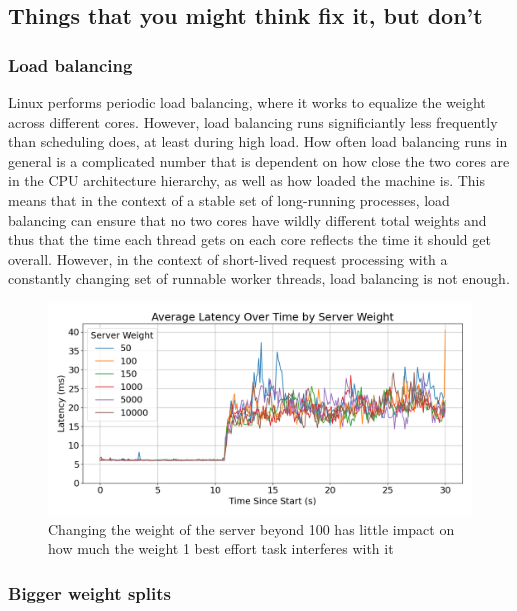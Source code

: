 \subsection{Things that you might think fix it, but don't}

\subsubsection{Load balancing}

Linux performs periodic load balancing, where it works to equalize the weight
across different cores. However, load balancing runs significiantly less
frequently than scheduling does, at least during high load. How often load
balancing runs in general is a complicated number that is dependent on how close
the two cores are in the CPU architecture hierarchy, as well as how loaded the
machine is. This means that in the context of a stable set of long-running
processes, load balancing can ensure that no two cores have wildly different
total weights and thus that the time each thread gets on each core reflects the
time it should get overall. However, in the context of short-lived request
processing with a constantly changing set of runnable worker threads, load
balancing is not enough.

\begin{figure}[t]
    \centering
    \includegraphics[width=\columnwidth]{graphs/srv-bg-weight-cmp-low.png}
    \caption{Changing the weight of the server beyond 100 has little impact on
    how much the weight 1 best effort task interferes with
    it}\label{fig:srv-bg-weight-cmp}
\end{figure}

\subsubsection{Bigger weight splits}

